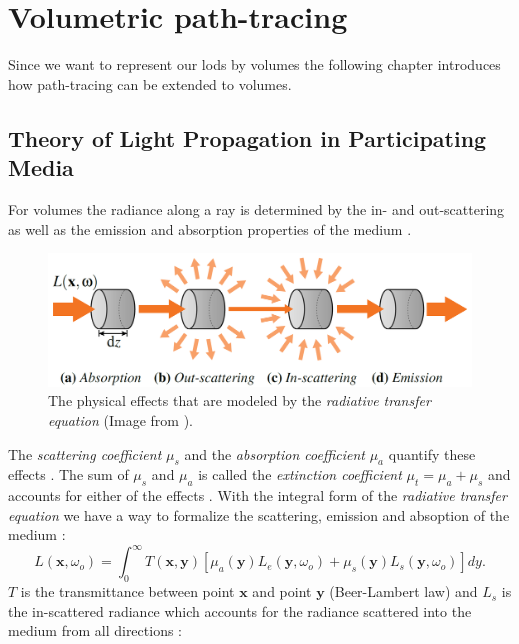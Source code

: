 \section{Volumetric path-tracing}
Since we want to represent our \acsp{lod} by volumes the following chapter introduces how path-tracing can be extended to volumes.
\subsection{Theory of Light Propagation in Participating Media}
\label{subsec:theory_of_light_propagation_in_participating_media}
For volumes the radiance along a ray is determined by the in- and out-scattering as well as the emission and absorption properties of the medium \cite[p. 3]{novak_overview}.
\begin{figure}[!ht]
    \centering
    \includegraphics[width=0.8\linewidth]{img/novak_volume_effects.png}
    \caption{The physical effects that are modeled by the \textit{radiative transfer equation} (Image from \cite[p. 2]{novak_overview}).}
    \label{fig:novak_volume_effects}
\end{figure}
The \textit{scattering coefficient} $\mu_s$ and the \textit{absorption coefficient} $\mu_a$ quantify these effects \cite[p. 2]{novak_overview}.
The sum of $\mu_s$ and $\mu_a$ is called the \textit{extinction coefficient} $\mu_t=\mu_a + \mu_s$ and accounts for either of the effects \cite[p. 2]{novak_overview}.
With the integral form of the \textit{radiative transfer equation} we have a way to formalize the scattering, emission and absoption of the medium \cite[p. 3]{novak_overview}:
\begin{equation}
    \label{eq:radiative_transfer}
    L(\boldsymbol{x}, \omega_o) = \int_0^\infty T(\boldsymbol{x}, \boldsymbol{y})[\mu_a(\boldsymbol{y})L_e(\boldsymbol{y}, \omega_o) + \mu_s(\boldsymbol{y})L_s(\boldsymbol{y}, \omega_o)]dy.
\end{equation}
$T$ is the transmittance between point $\boldsymbol{x}$ and point $\boldsymbol{y}$ (Beer-Lambert law) and $L_s$ is the in-scattered radiance which accounts for the radiance scattered into the medium from all directions \cite[p. 3]{novak_overview}:
